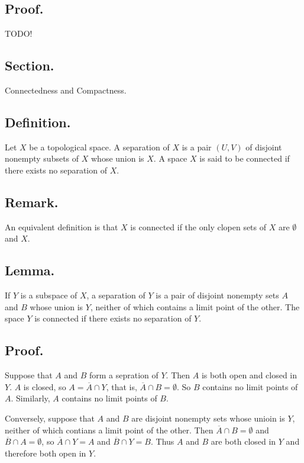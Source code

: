 \documentclass[titlepage]{article}
\begin{document}
\subsection{Proof.} TODO!

\newpage {}

\subsection{Section.} Connectedness and Compactness.

\subsection{Definition.} Let $X$ be a topological space. A separation of $X$ is a pair $(U, V)$ of disjoint nonempty subsets of $X$ whose union is $X$. A space $X$ is said to be connected if there exists no separation of $X$.

\subsection{Remark.} An equivalent definition is that $X$ is connected if the only clopen sets of $X$ are $\emptyset$ and $X$.

\subsection{Lemma.} If $Y$ is a subspace of $X$, a separation of $Y$ is a pair of disjoint nonempty sets $A$ and $B$ whose union is $Y$,  neither of which contains a limit point of the other. The space $Y$ is connected if there exists no separation of $Y$.

\subsection{Proof.} Suppose that $A$ and $B$ form a sepration of $Y$. Then $A$ is both open and closed in $Y$. $A$ is closed, so $A = \overline{A} \cap Y$, that is, $\overline{A} \cap B = \emptyset$. So $B$ contains no limit points of $A$. Similarly, $A$ contains no limit points of $B$.

Conversely, suppose that $A$ and $B$ are disjoint nonempty sets whose unioin is $Y$, neither of which contians a limit point of the other. Then $\overline{A} \cap B = \emptyset$ and $\overline{B} \cap A = \emptyset$, so $\overline{A} \cap Y = A$ and $\overline{B} \cap Y = B$. Thus $A$ and $B$ are both closed in $Y$ and therefore both open in $Y$.
\end{document}
